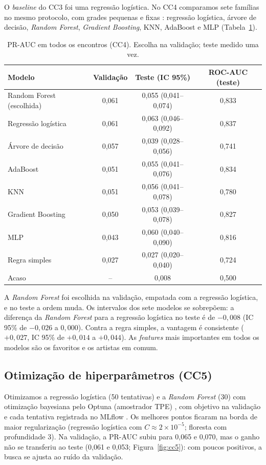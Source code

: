 \documentclass[12pt]{article}
\begin{document}
O \emph{baseline} do CC3 foi uma regressão logística. No CC4 comparamos sete famílias no mesmo
protocolo, com grades pequenas e fixas \cite{pedregosa2011scikit}: regressão logística, árvore de
decisão, \emph{Random Forest}, \emph{Gradient Boosting}, KNN, AdaBoost e MLP (Tabela~\ref{tab:cc4}).

\begin{table}[!htbp]
\centering
\caption{PR-AUC em todos os encontros (CC4). Escolha na validação; teste medido uma vez.}
\label{tab:cc4}
\footnotesize
\begin{tabular}{lccc}
\toprule
Modelo & Validação & Teste (IC 95\%) & ROC-AUC (teste) \\
\midrule
Random Forest (escolhida) & 0,061 & 0,055 (0,041--0,074) & 0,833 \\
Regressão logística & 0,061 & 0,063 (0,046--0,092) & 0,837 \\
Árvore de decisão & 0,057 & 0,039 (0,028--0,056) & 0,741 \\
AdaBoost & 0,051 & 0,055 (0,041--0,076) & 0,834 \\
KNN & 0,051 & 0,056 (0,041--0,078) & 0,780 \\
Gradient Boosting & 0,050 & 0,053 (0,039--0,078) & 0,827 \\
MLP & 0,043 & 0,060 (0,040--0,090) & 0,816 \\
Regra simples & 0,027 & 0,027 (0,020--0,040) & 0,724 \\
Acaso & -- & 0,008 & 0,500 \\
\bottomrule
\end{tabular}
\end{table}

A \emph{Random Forest} foi escolhida na validação, empatada com a regressão logística, e no teste a
ordem muda. Os intervalos dos sete modelos se sobrepõem: a diferença da \emph{Random Forest} para a
regressão logística no teste é de $-0{,}008$ (IC 95\% de $-0{,}026$ a $0{,}000$). Contra a regra
simples, a vantagem é consistente ($+0{,}027$, IC 95\% de $+0{,}014$ a $+0{,}044$). As \emph{features}
mais importantes em todos os modelos são os favoritos e os artistas em comum.

\subsection{Otimização de hiperparâmetros (CC5)}

Otimizamos a regressão logística (50 tentativas) e a \emph{Random Forest} (30) com otimização
bayesiana pelo Optuna (amostrador TPE) \cite{akiba2019optuna}, com objetivo na validação e cada tentativa
registrada no MLflow \cite{zaharia2018accelerating}. Os melhores pontos ficaram na borda de maior
regularização (regressão logística com $C \approx 2 \times 10^{-5}$; floresta com profundidade 3). Na
validação, a PR-AUC subiu para 0,065 e 0,070, mas o ganho não se transferiu ao teste (0,061 e 0,053;
Figura~\ref{fig:cc5}): com poucos positivos, a busca se ajusta ao ruído da validação.
\end{document}

